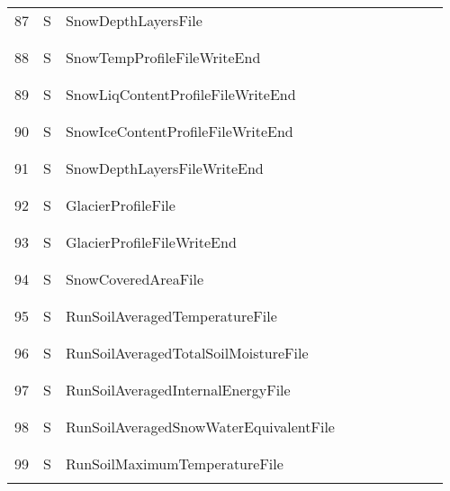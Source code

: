 \begin{longtable}{|c|c|l|c|c|c|c|p{}|c|p{}|}
87 & S & SnowDepthLayersFile & & & & & & & \\
&&&&&&&&&\\\hline%
&&&&&&&&&\\
88 & S & SnowTempProfileFileWriteEnd & & & & & & & \\
&&&&&&&&&\\\hline%
&&&&&&&&&\\
89 & S & SnowLiqContentProfileFileWriteEnd & & & & & & & \\
&&&&&&&&&\\\hline%
&&&&&&&&&\\
90 & S & SnowIceContentProfileFileWriteEnd & & & & & & & \\
&&&&&&&&&\\\hline%
&&&&&&&&&\\
91 & S & SnowDepthLayersFileWriteEnd & & & & & & & \\
&&&&&&&&&\\\hline%
&&&&&&&&&\\
92 & S & GlacierProfileFile & & & & & & & \\
&&&&&&&&&\\\hline%
&&&&&&&&&\\
93 & S & GlacierProfileFileWriteEnd & & & & & & & \\
&&&&&&&&&\\\hline%
&&&&&&&&&\\
94 & S & SnowCoveredAreaFile & & & & & & & \\
&&&&&&&&&\\\hline%
&&&&&&&&&\\
95 & S & RunSoilAveragedTemperatureFile & & & & & & & \\
&&&&&&&&&\\\hline%
&&&&&&&&&\\
96 & S & RunSoilAveragedTotalSoilMoistureFile & & & & & & & \\
&&&&&&&&&\\\hline%
&&&&&&&&&\\
97 & S & RunSoilAveragedInternalEnergyFile & & & & & & & \\
&&&&&&&&&\\\hline%
&&&&&&&&&\\
98 & S & RunSoilAveragedSnowWaterEquivalentFile & & & & & & & \\
&&&&&&&&&\\\hline%
&&&&&&&&&\\
99 & S & RunSoilMaximumTemperatureFile & & & & & & & \\
&&&&&&&&&\\\hline%

\end{longtable}
